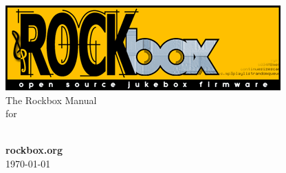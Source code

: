 \thispagestyle{empty}
\vspace*{0.3cm}
\begin{center}
{\includegraphics{frontpage/rockbox-web.png}}\\
\vspace{2cm}
\huge{The Rockbox Manual\\for\\\playername}\vspace{1cm}\\

\vspace{\fill}

\large \textbf{rockbox.org}\ \\\today


\end{center}

\pagebreak
\thispagestyle{empty}
\cleardoublepage
